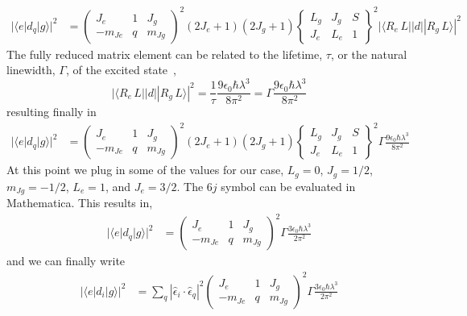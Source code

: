 \documentclass{article}[12pt]
\begin{document}
\begin{align}
|\langle e | d_{q} | g \rangle|^{2} & = \begin{pmatrix} J_{e} & 1 & J_{g} \\ -m_{Je} & q & m_{Jg} \end{pmatrix}^{2}
(2J_{e}+1)(2J_{g}+1)  \begin{Bmatrix}L_{g} & J_{g} & S \\ J_{e} & L_{e} & 1 \end{Bmatrix}^{2}|\langle R_{e}\, L || d || R_{g}\, L \rangle|^{2}
\end{align}
The fully reduced matrix element can be related to the lifetime, $\tau$, or the natural linewidth, $\Gamma$, of the excited state~\cite{Olivares:98},
\[
|\langle R_{e}\, L || d || R_{g}\, L \rangle|^{2} = \frac{1}{\tau} \frac{ 9\epsilon_{0} \hbar \lambda^{3}}{8 \pi^{2}} = \Gamma\frac{ 9\epsilon_{0} \hbar \lambda^{3}}{8 \pi^{2}} \]
resulting finally in 
\begin{align}
|\langle e | d_{q} | g \rangle|^{2} & = \begin{pmatrix} J_{e} & 1 & J_{g} \\ -m_{Je} & q & m_{Jg} \end{pmatrix}^{2}
(2J_{e}+1)(2J_{g}+1)  \begin{Bmatrix}L_{g} & J_{g} & S \\ J_{e} & L_{e} & 1 \end{Bmatrix}^{2}\Gamma\frac{ 9\epsilon_{0} \hbar \lambda^{3}}{8 \pi^{2}}
\end{align}
At this point we plug in some of the values for our case, $L_{g}=0$, $J_{g} = 1/2$, $m_{Jg}=-1/2$, $L_{e}=1$, and $J_{e}=3/2$.  The $6j$ symbol can be evaluated in Mathematica.  This results in,
\begin{align}
|\langle e | d_{q} | g \rangle|^{2} & = \begin{pmatrix} J_{e} & 1 & J_{g} \\ -m_{Je} & q & m_{Jg} \end{pmatrix}^{2}
\Gamma\frac{ 3\epsilon_{0} \hbar \lambda^{3}}{2 \pi^{2}}
\end{align}
and we can finally write
\begin{align}
|\langle e | d_{i} | g \rangle|^{2} & =  \sum_{q} |\hat{\epsilon}_{i}\cdot \hat{\epsilon}_{q}|^{2} \begin{pmatrix} J_{e} & 1 & J_{g} \\ -m_{Je} & q & m_{Jg} \end{pmatrix}^{2}
\Gamma\frac{ 3\epsilon_{0} \hbar \lambda^{3}}{2 \pi^{2}}
\end{align}
\end{document}
